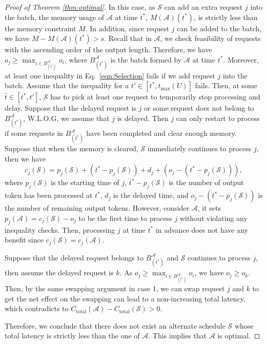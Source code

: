 \documentclass[11pt, a4paper]{article}
\theoremstyle{plain}
\theoremstyle{definition}
\theoremstyle{remark}
\begin{document}
\begin{proof}[Proof of Theorem \ref{thm:optimal}]
In this case, as \( \mathcal{S} \) can add an extra request $j$ into the batch, the memory usage of $\mathcal{A}$ at time $t^{*}$, $M(\mathcal{A})(t^*)$, is strictly less than the memory constraint $M$. In addition, since request $j$ can be added to the batch, we have $M-M(\mathcal{A})(t^*)>s$. Recall that in $\mathcal{A}$, we check feasibility of requests with the ascending order of the output length. Therefore, we have $o_j \geq \max_{i \in B^{\mathcal A}_{(t^{*})}}o_i$, where $B^{\mathcal A}_{(t^{*})}$ is the batch formed by $\mathcal{A}$ at time $t^{*}$. Moreover, at least one inequality in Eq.~\eqref{eqn:Selection} fails if we add request $j$ into the batch. Assume that the inequality for a $t' \in [t^{*},t_{\max}(U)]$ fails. Then, at some $\hat{t} \in [t^{*},t']$, $\mathcal{S}$ has to pick at least one request to temporarily stop processing and delay. Suppose that the delayed request is $j$ or some request does not belong to $B^{\mathcal A}_{(t^{*})}$, W.L.O.G, we assume that $j$ is delayed. Then $j$ can only restart to process if some requests in $B^{\mathcal A}_{(t^{*})}$ have been completed and clear enough memory. Suppose that when the memory is cleared, $\mathcal S$ immediately continues to process $j$, then we have
\[
c_j(\mathcal S) =  p_j(\mathcal S) + (t^{*}-p_j(\mathcal S)) + d_j + (o_j-(t^{*}-p_j(\mathcal S))),
\]
where $p_j(\mathcal S)$ is the starting time of $j$, $t^{*}-p_j(\mathcal S)$ is the number of output token has been processed at $t^{*}$, $d_j$ is the delayed time, and $o_j-(t^{*}-p_j(\mathcal S))$ is the number of remaining output tokens. However, consider $\mathcal A$, it sets $p_j(\mathcal A) = c_j(\mathcal S) - o_j$ to be the first time to process $j$ without violating any inequality checks. Then, processing $j$ at time $t^{*}$ in advance does not have any benefit since $c_j(\mathcal S) = c_j(\mathcal A)$. 

Suppose that the delayed request belongs to $B^{\mathcal A}_{(t^{*})}$ and $\mathcal S$ continues to process $j$, then assume the delayed request is $k$. As $o_j \geq \max_{i \in B^{\mathcal A}_{(t^{*})}}o_i$, we have $o_j \geq o_k$. Then, by the same swapping argument in case 1, we can swap request $j$ and $k$ to get the net effect on the swapping can lead to a non-increasing total latency, which contradicts to \(C_{\text{total}}(\mathcal{A}) - C_{\text{total}}(\mathcal{S})>0 \). 

Therefore, we conclude that there does not exist an alternate schedule $\mathcal S$ whose total latency is strictly less than the one of $\mathcal A$. This implies that $\mathcal A$ is optimal.
\end{proof}
\end{document}

